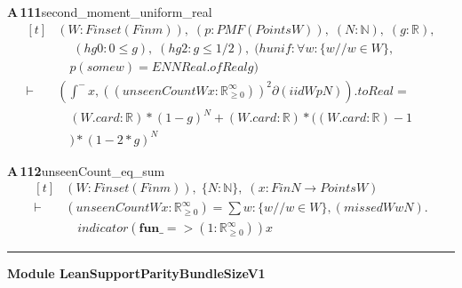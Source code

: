 \documentclass[conference]{IEEEtran}
\theoremstyle{definition}
\newcommand{\lean}[1]{\textsf{\footnotesize #1}}
\begin{document}
\noindent\textbf{A\,111}\quad\lean{second\_moment\_uniform\_real}
{\footnotesize\[ \begin{aligned}[t]
&(\mathit{W} : \mathit{Finset} (\mathit{Fin} \mathit{m})),\; (\mathit{p} : \mathit{PMF} (\mathit{Points} \mathit{W})),\; (\mathit{N} : \mathbb{N} ),\; (\mathit{g} : \mathbb{R} ),\\
&\quad \; (\mathit{hg0} : 0 \leq \mathit{g}),\; (\mathit{hg2} : \mathit{g} \leq 1/2),\; (\mathit{hunif} : \forall \mathit{w} : \{ \mathit{w} // \mathit{w} \in \mathit{W}\} ,\\
&\quad \mathit{p} (\mathit{some} \mathit{w}) = \mathit{ENNReal}.\mathit{ofReal} \mathit{g})\\
\vdash\;&(\int^{-} \mathit{x}, ((\mathit{unseenCount} \mathit{W} \mathit{x} : \mathbb{R}_{\geq0}^{\infty} ))^{2} ∂(\mathit{iid} \mathit{W} \mathit{p} \mathit{N})).\mathit{toReal} =\\
&\quad (\mathit{W}.\mathit{card} : \mathbb{R} ) * (1 - \mathit{g})^{\mathit{N}} + (\mathit{W}.\mathit{card} : \mathbb{R} ) * ((\mathit{W}.\mathit{card} : \mathbb{R} ) - 1\\
&\quad ) * (1 - 2*\mathit{g})^{\mathit{N}}
\end{aligned} \]}

\noindent\textbf{A\,112}\quad\lean{unseenCount\_eq\_sum}
{\footnotesize\[ \begin{aligned}[t]
&(\mathit{W} : \mathit{Finset} (\mathit{Fin} \mathit{m})),\; \{ \mathit{N} : \mathbb{N} \},\; (\mathit{x} : \mathit{Fin} \mathit{N} \to \mathit{Points} \mathit{W})\\
\vdash\;&(\mathit{unseenCount} \mathit{W} \mathit{x} : \mathbb{R}_{\geq0}^{\infty} ) = \textstyle\sum \mathit{w} : \{ \mathit{w} // \mathit{w} \in \mathit{W}\} , (\mathit{missed} \mathit{W} \mathit{w} \mathit{N}).\\
&\quad \mathit{indicator} (\mathbf{fun} \mathit{\_} => (1:\mathbb{R}_{\geq0}^{\infty} )) \mathit{x}
\end{aligned} \]}

\vspace{4pt}\noindent\rule{\columnwidth}{0.4pt}\par\vspace{2pt}
\noindent\textbf{Module \lean{LeanSupportParityBundleSizeV1}}\par\vspace{3pt}
\end{document}
